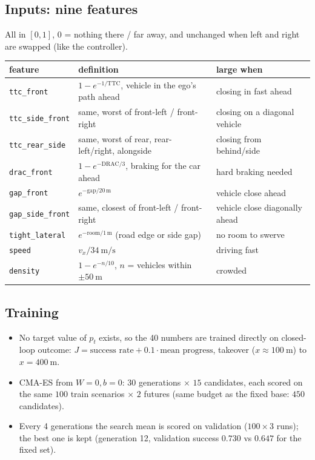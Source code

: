 \documentclass[11pt,a4paper]{article}
\begin{document}
\subsection{Inputs: nine features}
All in $[0,1]$, $0$ = nothing there / far away, and unchanged when left and right are swapped (like the controller).
\begin{center}
\small
\begin{tabular}{lll}
  \toprule
  feature & definition & large when \\
  \midrule
  \texttt{ttc\_front}       & $1 - e^{-1/\mathrm{TTC}}$, vehicle in the ego's path ahead & closing in fast ahead \\
  \texttt{ttc\_side\_front} & same, worst of front-left / front-right                     & closing on a diagonal vehicle \\
  \texttt{ttc\_rear\_side}  & same, worst of rear, rear-left/right, alongside & closing from behind/side \\
  \texttt{drac\_front}      & $1 - e^{-\mathrm{DRAC}/3}$, braking for the car ahead & hard braking needed \\
  \texttt{gap\_front}       & $e^{-\mathrm{gap}/20\,\mathrm{m}}$                          & vehicle close ahead \\
  \texttt{gap\_side\_front} & same, closest of front-left / front-right                   & vehicle close diagonally ahead \\
  \texttt{tight\_lateral}   & $e^{-\mathrm{room}/1\,\mathrm{m}}$ (road edge or side gap)  & no room to swerve \\
  \texttt{speed}            & $v_x / 34~\mathrm{m/s}$                                     & driving fast \\
  \texttt{density}          & $1 - e^{-n/10}$, $n$ = vehicles within $\pm 50~\mathrm{m}$  & crowded \\
  \bottomrule
\end{tabular}
\end{center}

\subsection{Training}
\begin{itemize}
  \item No target value of $p_t$ exists, so the 40 numbers are trained directly on closed-loop outcome:
        $J = \text{success rate} + 0.1 \cdot \text{mean progress}$, takeover ($x \approx 100~\mathrm{m}$) to $x = 400~\mathrm{m}$.
  \item CMA-ES from $W = 0, b = 0$: $30$ generations $\times$ $15$ candidates, each scored on the same
        $100$ train scenarios $\times$ $2$ futures (same budget as the fixed base: $450$ candidates).
  \item Every 4 generations the search mean is scored on validation ($100 \times 3$ runs); the best one is kept
        (generation 12, validation success $0.730$ vs $0.647$ for the fixed set).
\end{itemize}
\end{document}
